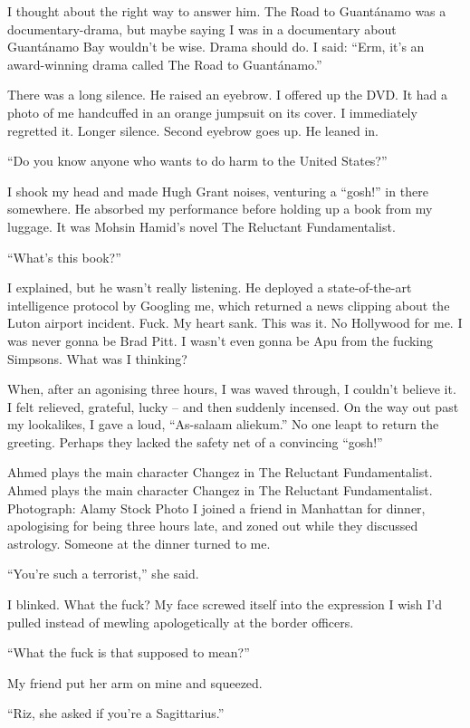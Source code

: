 \documentclass[10pt,a4paper]{article}
\begin{document}
I thought about the right way to answer him. The Road to Guantánamo was a documentary-drama, but maybe saying I was in a documentary about Guantánamo Bay wouldn’t be wise. Drama should do. I said: “Erm, it’s an award-winning drama called The Road to Guantánamo.”

There was a long silence. He raised an eyebrow. I offered up the DVD. It had a photo of me handcuffed in an orange jumpsuit on its cover. I immediately regretted it. Longer silence. Second eyebrow goes up. He leaned in.

“Do you know anyone who wants to do harm to the United States?”

I shook my head and made Hugh Grant noises, venturing a “gosh!” in there somewhere. He absorbed my performance before holding up a book from my luggage. It was Mohsin Hamid’s novel The Reluctant Fundamentalist.

“What’s this book?”

I explained, but he wasn’t really listening. He deployed a state-of-the-art intelligence protocol by Googling me, which returned a news clipping about the Luton airport incident. Fuck. My heart sank. This was it. No Hollywood for me. I was never gonna be Brad Pitt. I wasn’t even gonna be Apu from the fucking Simpsons. What was I thinking?

When, after an agonising three hours, I was waved through, I couldn’t believe it. I felt relieved, grateful, lucky – and then suddenly incensed. On the way out past my lookalikes, I gave a loud, “As-salaam aliekum.” No one leapt to return the greeting. Perhaps they lacked the safety net of a convincing “gosh!”

Ahmed plays the main character Changez in The Reluctant Fundamentalist.
Ahmed plays the main character Changez in The Reluctant Fundamentalist. Photograph: Alamy Stock Photo
I joined a friend in Manhattan for dinner, apologising for being three hours late, and zoned out while they discussed astrology. Someone at the dinner turned to me.

“You’re such a terrorist,” she said.

I blinked. What the fuck? My face screwed itself into the expression I wish I’d pulled instead of mewling apologetically at the border officers.

“What the fuck is that supposed to mean?”

My friend put her arm on mine and squeezed.

“Riz, she asked if you’re a Sagittarius.”
\end{document}
